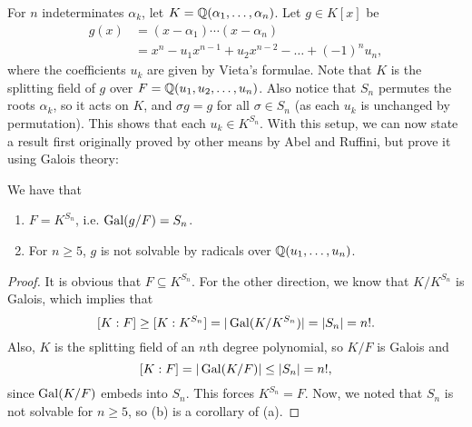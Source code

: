 For $n$ indeterminates $\alpha_k$, let $K = \mathbb{{Q}}(\alpha_1, \ldots, \alpha_n)$. Let $g \in K[x]$ be
\begin{align*}
    g(x)
    &= (x - \alpha_1) \cdots (x - \alpha_n) \\
    &= x^n - u_1 x^{n - 1} + u_2 x^{n - 2} - \ldots + (-1)^n u_n,
\end{align*}
where the coefficients $u_k$ are given by Vieta's formulae. Note that $K$ is the splitting field of $g$ over $F = \mathbb{{Q}}(u_1, u_2, \ldots, u_n)$. Also notice that $S_n$ permutes the roots $\alpha_k$, so it acts on $K$, and $\sigma g = g$ for all $\sigma \in S_n$ (as each $u_k$ is unchanged by permutation). This shows that each $u_k \in K^{S_n}$. With this setup, we can now state a result first originally proved by other means by Abel and Ruffini, but prove it using Galois theory:

\begin{theorem}
\label{thm_abel_ruffini}
    We have that
    \begin{enumerate}[label=(\alph*)]
        \item $F = K^{S_n}$, i.e. $\operatorname{Gal}(g/F) = S_n$.
        \item For $n \geq 5$, $g$ is not solvable by radicals over $\mathbb{{Q}}(u_1, \ldots, u_n)$.
    \end{enumerate}
\end{theorem}

\begin{proof}
    It is obvious that $F \subseteq K^{S_n}$. For the other direction, we know that $K/K^{S_n}$ is Galois, which implies that
    \[
        [K : F] \geq [K : K^{S_n}] = |\operatorname{Gal}(K/K^{S_n})| = |S_n| = n!.
    \]
    Also, $K$ is the splitting field of an $n$th degree polynomial, so $K/F$ is Galois and
    \[
        [K : F] = |\operatorname{Gal}(K/F)| \leq |S_n| = n!,
    \]    
    since $\operatorname{Gal}(K/F)$ embeds into $S_n$. This forces $K^{S_n} = F$. Now, we noted that $S_n$ is not solvable for $n \geq 5$, so (b) is a corollary of (a).
\end{proof}
    
